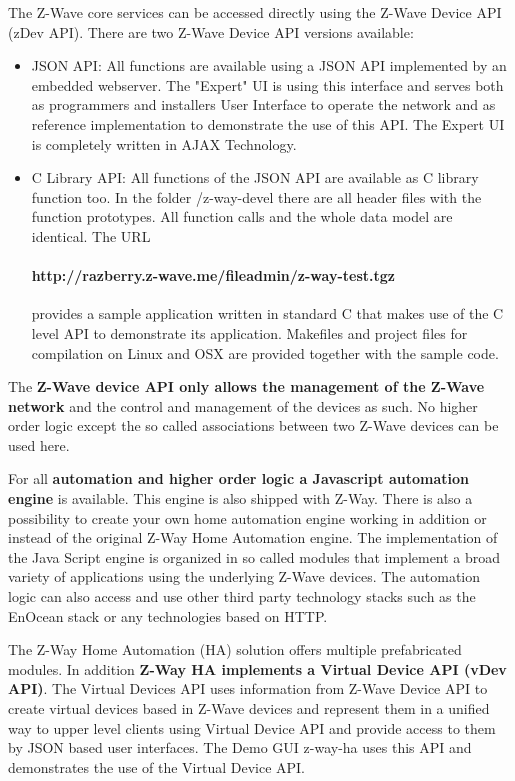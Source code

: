 The Z-Wave core services can be accessed directly using the Z-Wave Device API (zDev API). There are two
Z-Wave Device API versions available:
\begin{itemize}
\item JSON API: All functions are available using a JSON API implemented by an 
embedded webserver. The "Expert" UI is using this interface and serves both as programmers 
and installers User Interface to operate the network and as reference implementation to demonstrate the use of this 
API. The Expert UI is completely written in AJAX Technology.
\item C Library API: All functions of the JSON API are available as C library 
function too. In the folder /z-way-devel there are all header files with the function 
prototypes. All function calls and the whole data model are identical. The URL

\paragraph{http://razberry.z-wave.me/fileadmin/z-way-test.tgz}

provides a sample application written in standard C that makes use of the C level API to 
demonstrate its application. Makefiles and project files for compilation on Linux and 
OSX are provided together with the sample code.


\end{itemize}

The \textbf{Z-Wave device API only allows the management of the Z-Wave network} and the control
and management of the devices as such. No higher order logic except the so called associations
between two Z-Wave devices can be used here.

For all \textbf{automation and higher order logic a Javascript automation engine} is available.
This engine is also shipped with Z-Way. There is also a possibility to create your own home automation engine
working in addition or instead  of the original Z-Way Home Automation engine. 
The implementation of the Java Script engine is organized in so called modules that implement 
a broad variety of applications using the underlying Z-Wave devices. The automation logic 
can also access and use other third party technology stacks such as the EnOcean stack
or any technologies based on HTTP.

The Z-Way Home Automation (HA) solution offers multiple prefabricated modules.
In addition \textbf{Z-Way HA implements
a Virtual Device API (vDev API)}. The Virtual Devices API uses information
from Z-Wave Device API to create virtual devices based in Z-Wave devices and
represent them in a unified way to upper level clients using Virtual Device API
and provide access to them by JSON based user interfaces.
The Demo GUI z-way-ha uses this API and demonstrates the use of the Virtual Device API.


